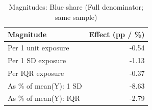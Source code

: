 \begin{table}

\caption{Magnitudes: Blue share (Full denominator; same sample)}
\centering
\begin{tabular}[t]{lr}
\toprule
Magnitude & Effect (pp / \%)\\
\midrule
Per 1 unit exposure & -0.54\\
Per 1 SD exposure & -1.13\\
Per IQR exposure & -0.37\\
As \% of mean(Y): 1 SD & -8.63\\
As \% of mean(Y): IQR & -2.79\\
\bottomrule
\end{tabular}
\end{table}
